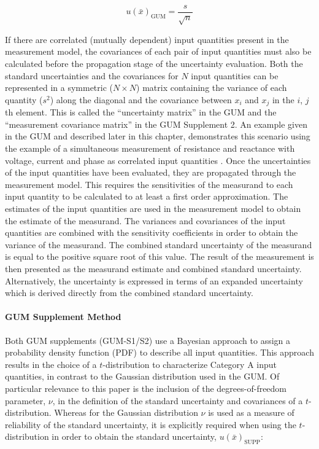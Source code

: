 \documentclass[../thesis/thesis.tex]{subfiles}
\begin{document}
\begin{refsection}
\begin{equation}
u(\bar{x})_{\textrm{GUM}}=\frac{s}{\sqrt{n}}
\label{ch3_eqn_ux_gum}
\end{equation}

If there are correlated (mutually dependent) input quantities present in the measurement model, the covariances of each pair of input quantities must also be calculated before the propagation stage of the uncertainty evaluation. Both the standard uncertainties and the covariances for $N$ input quantities can be represented in a symmetric ($N\times N$) matrix containing the variance of each quantity ($s^2$) along the diagonal and the covariance between $x_i$ and $x_j$ in the $i$, $j$th element. This is called the “uncertainty matrix” in the GUM and the “measurement covariance matrix” in the GUM Supplement 2. An example given in the GUM and described later in this chapter, demonstrates this scenario using the example of a simultaneous measurement of resistance and reactance with voltage, current and phase as correlated input quantities \cite[Example~H.2]{GUM_2008}. Once the uncertainties of the input quantities have been evaluated, they are propagated through the measurement model. This requires the sensitivities of the measurand to each input quantity to be calculated to at least a first order approximation. The estimates of the input quantities are used in the measurement model to obtain the estimate of the measurand. The variances and covariances of the input quantities are combined with the sensitivity coefficients in order to obtain the variance of the measurand. The combined standard uncertainty of the measurand is equal to the positive square root of this value. The result of the measurement is then presented as the measurand estimate and combined standard uncertainty. Alternatively, the uncertainty is expressed in terms of an expanded uncertainty which is derived directly from the combined standard uncertainty.

\paragraph{GUM Supplement Method}

Both GUM supplements (GUM-S1/S2) \cite{GUM_S1,GUM_S2} use a Bayesian approach \cite{Klauenberg_2012} to assign a probability density function (PDF) to describe all input quantities. This approach results in the choice of a $t$-distribution to characterize Category A input quantities, in contrast to the Gaussian distribution used in the GUM. Of particular relevance to this paper is the inclusion of the degrees-of-freedom parameter, $\nu$, in the definition of the standard uncertainty and covariances of a $t$-distribution. Whereas for the Gaussian distribution $\nu$ is used as a measure of reliability of the standard uncertainty, it is explicitly required when using the $t$-distribution in order to obtain the standard uncertainty, $u(\bar{x})_{\textrm{SUPP}}$:


\end{refsection}
\end{document}
